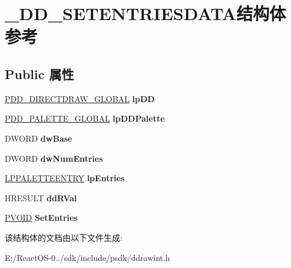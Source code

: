 \hypertarget{struct___d_d___s_e_t_e_n_t_r_i_e_s_d_a_t_a}{}\section{\+\_\+\+D\+D\+\_\+\+S\+E\+T\+E\+N\+T\+R\+I\+E\+S\+D\+A\+T\+A结构体 参考}
\label{struct___d_d___s_e_t_e_n_t_r_i_e_s_d_a_t_a}
\subsection*{Public 属性}
\begin{DoxyCompactItemize}
\item 
\mbox{\label{struct___d_d___s_e_t_e_n_t_r_i_e_s_d_a_t_a_a5b79d308d5e7271d2aa44a56031b8e91}} 
\hyperlink{struct___d_d___d_i_r_e_c_t_d_r_a_w___g_l_o_b_a_l}{P\+D\+D\+\_\+\+D\+I\+R\+E\+C\+T\+D\+R\+A\+W\+\_\+\+G\+L\+O\+B\+AL} {\bfseries lp\+DD}
\item 
\mbox{\label{struct___d_d___s_e_t_e_n_t_r_i_e_s_d_a_t_a_a01622dbe9522942242802d112473e693}} 
\hyperlink{struct___d_d___p_a_l_e_t_t_e___g_l_o_b_a_l}{P\+D\+D\+\_\+\+P\+A\+L\+E\+T\+T\+E\+\_\+\+G\+L\+O\+B\+AL} {\bfseries lp\+D\+D\+Palette}
\item 
\mbox{\label{struct___d_d___s_e_t_e_n_t_r_i_e_s_d_a_t_a_a6b0168c510df3c4a95702f62267eed30}} 
D\+W\+O\+RD {\bfseries dw\+Base}
\item 
\mbox{\label{struct___d_d___s_e_t_e_n_t_r_i_e_s_d_a_t_a_a2e28cf02a460c551cf2978840403b606}} 
D\+W\+O\+RD {\bfseries dw\+Num\+Entries}
\item 
\mbox{\label{struct___d_d___s_e_t_e_n_t_r_i_e_s_d_a_t_a_a2bcc08812bd2c32b691deba816b802f0}} 
\hyperlink{structtag_p_a_l_e_t_t_e_e_n_t_r_y}{L\+P\+P\+A\+L\+E\+T\+T\+E\+E\+N\+T\+RY} {\bfseries lp\+Entries}
\item 
\mbox{\label{struct___d_d___s_e_t_e_n_t_r_i_e_s_d_a_t_a_a720faaa3f8aebfb7a8577de69dad5419}} 
H\+R\+E\+S\+U\+LT {\bfseries dd\+R\+Val}
\item 
\mbox{\label{struct___d_d___s_e_t_e_n_t_r_i_e_s_d_a_t_a_ac689c1100831320123649be54d3641f4}} 
\hyperlink{interfacevoid}{P\+V\+O\+ID} {\bfseries Set\+Entries}
\end{DoxyCompactItemize}


该结构体的文档由以下文件生成\+:\begin{DoxyCompactItemize}
\item 
E\+:/\+React\+O\+S-\/0../sdk/include/psdk/ddrawint.\+h\end{DoxyCompactItemize}

